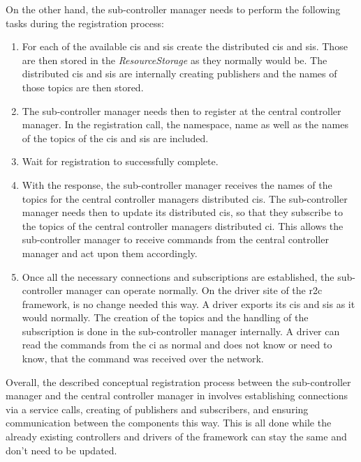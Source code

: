 On the other hand, the sub-controller manager needs to perform the following tasks during the registration process:
\begin{enumerate}
    \item For each of the available \glspl{ci} and \glspl{si} create the distributed \glspl{ci} and \glspl{si}. Those are then stored in the \textit{ResourceStorage} as they normally would be. The distributed \glspl{ci} and \glspl{si} are internally creating publishers and the names of those topics are then stored. 

    \item The sub-controller manager needs then to register at the central controller manager. In the registration call, the namespace, name as well as the names of the topics of the \glspl{ci} and \glspl{si} are included. 
    
    \item Wait for registration to successfully complete. 
    
    \item With the response, the sub-controller manager receives the names of the topics for the central controller managers distributed \glspl{ci}. The sub-controller manager needs then to update its distributed \glspl{ci}, so that they subscribe to the topics of the central controller managers distributed \gls{ci}. This allows the sub-controller manager to receive commands from the central controller manager and act upon them accordingly.

    \item Once all the necessary connections and subscriptions are established, the sub-controller manager can operate normally. On the driver site of the \gls{r2c} framework, is no change needed this way. A driver exports its \glspl{ci} and \glspl{si} as it would normally. The creation of the topics and the handling of the subscription is done in the sub-controller manager internally. A driver can read the commands from the \gls{ci} as normal and does not know or need to know, that the command was received over the network.
    
\end{enumerate}
Overall, the described conceptual registration process between the sub-controller manager and the central controller manager in involves establishing connections via a service calls, creating of publishers and subscribers, and ensuring communication between the components this way. This is all done while the already existing controllers and drivers of the framework can stay the same and don't need to be updated.

